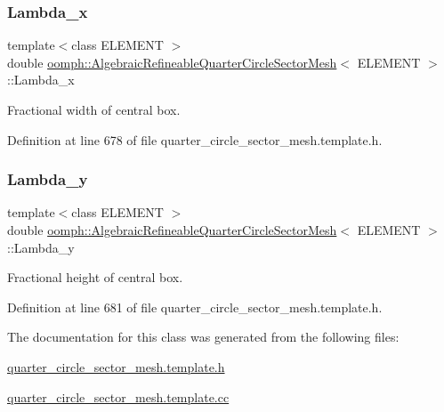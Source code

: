 \subsubsection{\texorpdfstring{Lambda\+\_\+x}{Lambda\_x}}
{\footnotesize\ttfamily template$<$class E\+L\+E\+M\+E\+NT $>$ \\
double \hyperlink{classoomph_1_1AlgebraicRefineableQuarterCircleSectorMesh}{oomph\+::\+Algebraic\+Refineable\+Quarter\+Circle\+Sector\+Mesh}$<$ E\+L\+E\+M\+E\+NT $>$\+::Lambda\+\_\+x\hspace{0.3cm}{\ttfamily [private]}}



Fractional width of central box. 



Definition at line 678 of file quarter\+\_\+circle\+\_\+sector\+\_\+mesh.\+template.\+h.

\mbox{\label{classoomph_1_1AlgebraicRefineableQuarterCircleSectorMesh_a2690e44e43dd4ed1e45b02f4b71ae43f}} 
\subsubsection{\texorpdfstring{Lambda\+\_\+y}{Lambda\_y}}
{\footnotesize\ttfamily template$<$class E\+L\+E\+M\+E\+NT $>$ \\
double \hyperlink{classoomph_1_1AlgebraicRefineableQuarterCircleSectorMesh}{oomph\+::\+Algebraic\+Refineable\+Quarter\+Circle\+Sector\+Mesh}$<$ E\+L\+E\+M\+E\+NT $>$\+::Lambda\+\_\+y\hspace{0.3cm}{\ttfamily [private]}}



Fractional height of central box. 



Definition at line 681 of file quarter\+\_\+circle\+\_\+sector\+\_\+mesh.\+template.\+h.



The documentation for this class was generated from the following files\+:\begin{DoxyCompactItemize}
\item 
\hyperlink{quarter__circle__sector__mesh_8template_8h}{quarter\+\_\+circle\+\_\+sector\+\_\+mesh.\+template.\+h}\item 
\hyperlink{quarter__circle__sector__mesh_8template_8cc}{quarter\+\_\+circle\+\_\+sector\+\_\+mesh.\+template.\+cc}\end{DoxyCompactItemize}
